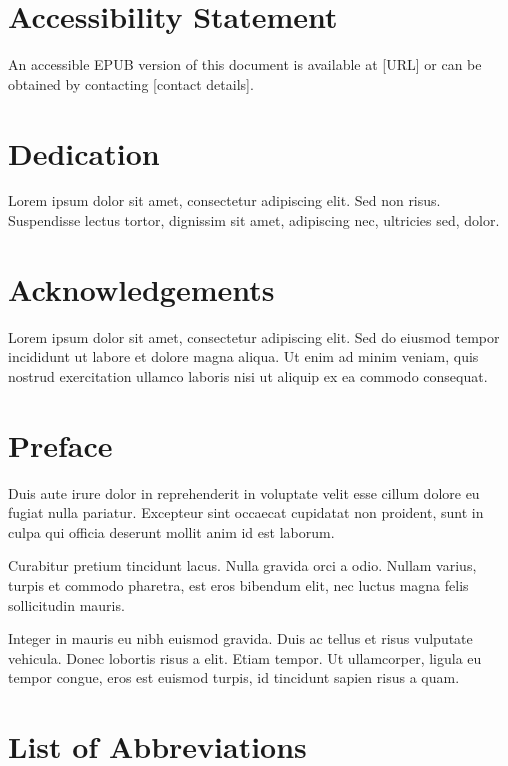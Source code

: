 \documentclass[12pt,reqno,oneside]{amsbook}
\theoremstyle{definition}
\begin{document}
\setcounter{page}{2} %

\chapter*{Accessibility Statement}
\noindent
An accessible EPUB version of this document is available at [URL] or can be obtained by contacting [contact details].


\chapter*{Dedication}


Lorem ipsum dolor sit amet, consectetur adipiscing elit. Sed non risus. Suspendisse lectus tortor, dignissim sit amet, adipiscing nec, ultricies sed, dolor.

\chapter*{Acknowledgements}

Lorem ipsum dolor sit amet, consectetur adipiscing elit. Sed do eiusmod tempor incididunt ut labore et dolore magna aliqua. Ut enim ad minim veniam, quis nostrud exercitation ullamco laboris nisi ut aliquip ex ea commodo consequat.

\chapter*{Preface}

Duis aute irure dolor in reprehenderit in voluptate velit esse cillum dolore eu fugiat nulla pariatur. Excepteur sint occaecat cupidatat non proident, sunt in culpa qui officia deserunt mollit anim id est laborum.

Curabitur pretium tincidunt lacus. Nulla gravida orci a odio. Nullam varius, turpis et commodo pharetra, est eros bibendum elit, nec luctus magna felis sollicitudin mauris.

Integer in mauris eu nibh euismod gravida. Duis ac tellus et risus vulputate vehicula. Donec lobortis risus a elit. Etiam tempor. Ut ullamcorper, ligula eu tempor congue, eros est euismod turpis, id tincidunt sapien risus a quam.

\tableofcontents
\listoffigures
\listoftables

\chapter*{List of Abbreviations}
\end{document}
